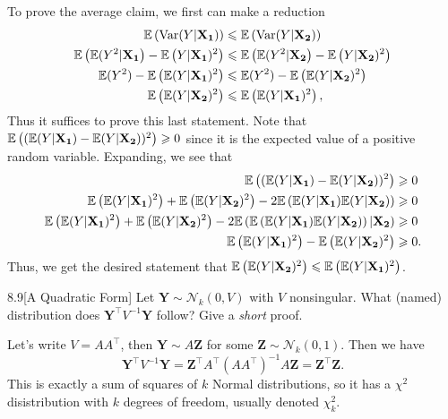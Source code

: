 \documentclass{pset}
\begin{document}
\begin{parts}
  To prove the average claim, we first can make a reduction
  \[
    \begin{aligned}
      \mathbb{E}\left(\textrm{Var}(Y|\mathbf{X_1})\right) &\leqslant \mathbb{E}\left(\textrm{Var}(Y|\mathbf{X_2})\right)\\ \mathbb{E}\left(\mathbb{E}(Y^2|\mathbf{X_1}\right) - \mathbb{E}\left(Y|\mathbf{X_1})^2\right) &\leqslant \mathbb{E}\left(\mathbb{E}(Y^2|\mathbf{X_2}\right) - \mathbb{E}\left(Y|\mathbf{X_2})^2\right)\\
      \mathbb{E}(Y^2)-\mathbb{E}\left(\mathbb{E}(Y|\mathbf{X_1})^2\right) &\leqslant \mathbb{E}(Y^2)-\mathbb{E}\left(\mathbb{E}(Y|\mathbf{X_2})^2\right)\\
      \mathbb{E}\left(\mathbb{E}(Y|\mathbf{X_2})^2\right) &\leqslant \mathbb{E}\left(\mathbb{E}(Y|\mathbf{X_1})^2\right),
    \end{aligned}
  \]
  Thus it suffices to prove this last statement. Note that $\mathbb{E}\left((\mathbb{E}(Y|\mathbf{X_1})-\mathbb{E}(Y|\mathbf{X_2}))^2\right)\geqslant 0$ since it is the expected value of a positive random variable. Expanding, we see that
  \[
    \begin{aligned}
      \mathbb{E}\left((\mathbb{E}(Y|\mathbf{X_1})-\mathbb{E}(Y|\mathbf{X_2}))^2\right)&\geqslant 0\\
      \mathbb{E}\left(\mathbb{E}(Y|\mathbf{X_1})^2\right) + \mathbb{E}\left(\mathbb{E}(Y|\mathbf{X_2})^2\right) -2\mathbb{E}\left(\mathbb{E}(Y|\mathbf{X_1})\mathbb{E}(Y|\mathbf{X_2})\right) &\geqslant 0\\
      \mathbb{E}\left(\mathbb{E}(Y|\mathbf{X_1})^2\right) + \mathbb{E}\left(\mathbb{E}(Y|\mathbf{X_2})^2\right) -2\mathbb{E}\left(\mathbb{E}\left(\mathbb{E}(Y|\mathbf{X_1})\mathbb{E}(Y|\mathbf{X_2})\right)|\mathbf{X_2}\right) &\geqslant 0\\
      \mathbb{E}\left(\mathbb{E}(Y|\mathbf{X_1})^2\right) - \mathbb{E}\left(\mathbb{E}(Y|\mathbf{X_2})^2\right) &\geqslant 0.
    \end{aligned}
  \]
  Thus, we get the desired statement that $\mathbb{E}\left(\mathbb{E}(Y|\mathbf{X_2})^2\right) \leqslant \mathbb{E}\left(\mathbb{E}(Y|\mathbf{X_1})^2\right)$.
\end{parts}

\begin{problem}{8.9}[A Quadratic Form] Let $\mathbf{Y} \sim \mathcal{N}_k(0, V)$ with $V$ nonsingular. What (named) distribution does $\mathbf{Y}^\intercal V^{-1}\mathbf{Y}$ follow? Give a \emph{short} proof.
\end{problem}

\begin{solution}
  Let's write $V=AA^\intercal$, then $\mathbf{Y}\sim A\mathbf{Z}$ for some $\mathbf{Z}\sim \mathcal{N}_k(0, 1)$. Then we have
  \[
    \mathbf{Y}^\intercal V^{-1} \mathbf{Y} = \mathbf{Z}^\intercal A^\intercal (AA^\intercal)^{-1} A\mathbf{Z} = \mathbf{Z}^\intercal \mathbf{Z}.
  \]
  This is exactly a sum of squares of $k$ Normal distributions, so it has a $\chi^2$ disistribution with $k$ degrees of freedom, usually denoted $\chi^2_k$.
\end{solution}
\end{document}
